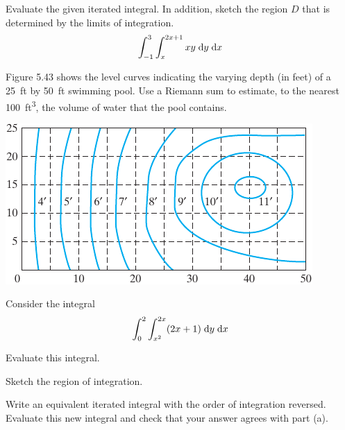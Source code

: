 \documentclass[boxes]{gsypset}
\begin{document}
	\begin{problem}[5.2.7]
		Evaluate the given iterated integral.
		In addition, sketch the region $D$ that is determined by the limits of integration.
		\[
			\int_{-1}^3 \int_x^{2x+1} xy \;\mathrm{d}y \;\mathrm{d}x
		\]
	\end{problem}
	\begin{solution}
		
	\end{solution}
	
	\begin{problem}[5.2.14]
		Figure 5.43 shows the level curves indicating the varying depth (in feet) of a 
		\SI{25}{ft} by \SI{50}{ft} swimming pool. 
		Use a Riemann sum to estimate, to the nearest \SI{100}{ft^3}, 
		the volume of water that the pool contains.
		\begin{center}
			\includegraphics{img/5_2_14}
			\renewcommand{\thefigure}{5.43}
		\end{center}
	\end{problem}
	\begin{solution}
		
	\end{solution}
	
	\begin{problem}[5.3.1]
		Consider the integral
		\[
			\int_0^2 \int_{x^2}^{2x} (2x + 1) \;\mathrm{d}y \;\mathrm{d}x
		\]
		\begin{subproblems}
			\subproblem Evaluate this integral.
				\begin{solution}
					
				\end{solution}
			\subproblem Sketch the region of integration.
				\begin{solution}
					
				\end{solution}
			\subproblem
				Write an equivalent iterated integral with the order of integration reversed. 
				Evaluate this new integral and check that your answer agrees with part (a).
				\begin{solution}
					
				\end{solution}
		\end{subproblems}
	\end{problem}
	
\end{document}
